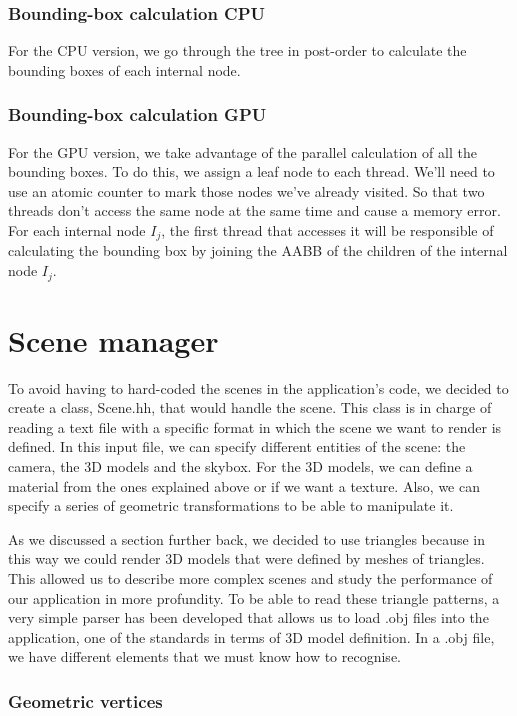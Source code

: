 \documentclass[titlepage,12pt]{report}
\begin{document}
\subsubsection{Bounding-box calculation CPU}

For the CPU version, we go through the tree in post-order to calculate the bounding boxes of each internal node. 

\subsubsection{Bounding-box calculation GPU}

For the GPU version, we take advantage of the parallel calculation of all the bounding boxes. To do this, we assign a leaf node to each thread. We'll need to use an atomic counter to mark those nodes we've already visited. So that two threads don't access the same node at the same time and cause a memory error. For each internal node $I_j$, the first thread that accesses it will be responsible of calculating the bounding box by joining the AABB of the children of the internal node $I_j$.

\section{Scene manager}

To avoid having to hard-coded the scenes in the application's code, we decided to create a class, Scene.hh, that would handle the scene. This class is in charge of reading a text file with a specific format in which the scene we want to render is defined. In this input file, we can specify different entities of the scene: the camera, the 3D models and the skybox. For the 3D models, we can define a material from the ones explained above or if we want a texture. Also, we can specify a series of geometric transformations to be able to manipulate it.

As we discussed a section further back, we decided to use triangles because in this way we could render 3D models that were defined by meshes of triangles. This allowed us to describe more complex scenes and study the performance of our application in more profundity. To be able to read these triangle patterns, a very simple parser has been developed that allows us to load .obj files into the application, one of the standards in terms of 3D model definition. In a .obj file, we have different elements that we must know how to recognise.

\subsubsection{Geometric vertices}
\end{document}
